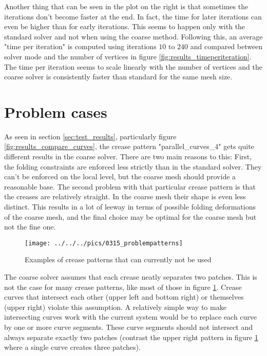 \documentclass[a4paper,twoside,12pt,nochapterprefix]{scrbook}
\begin{document}
Another thing that can be seen in the plot on the right is that sometimes the iterations don't become faster at the end. In fact, the time for later iterations can even be higher than for early iterations. This seems to happen only with the standard solver and not when using the coarse method.\newline
Following this, an average "time per iteration" is computed using iterations $10$ to $240$ and compared between solver mode and the number of vertices in figure \ref{fig:results_timeperiteration}. The time per iteration seems to scale linearly with the number of vertices and the coarse solver is consistently faster than standard for the same mesh size.\newline %

\section{Problem cases}\label{sec:problem_cases}
As seen in section \ref{sec:test_results}, particularly figure \ref{fig:results_compare_curves}, the crease pattern "parallel\_curves\_4" gets quite different results in the coarse solver. There are two main reasons to this: First, the folding constraints are enforced less strictly than in the standard solver. They can't be enforced on the local level, but the coarse mesh should provide a reasonable base. The second problem with that particular crease pattern is that the creases are relatively straight. In the coarse mesh their shape is even less distinct. This results in a lot of leeway in terms of possible folding deformations of the coarse mesh, and the final choice may be optimal for the coarse mesh but not the fine one.\newline
\begin{figure}
    \centering
    \texttt{[image: ../../../pics/0315\_problempatterns]}
    \caption{Examples of crease patterns that can currently not be used}
      \label{fig:problempatterns}
\end{figure}
The coarse solver assumes that each crease neatly separates two patches. This is not the case for many crease patterns, like most of those in figure \ref{fig:problempatterns}. Crease curves that intersect each other (upper left and bottom right) or themselves (upper right) violate this assumption. A relatively simple way to make intersecting curves work with the current system would be to replace each curve by one or more curve segments. These curve segments should not intersect and always separate exactly two patches (contrast the upper right pattern in figure \ref{fig:problempatterns} where a single curve creates three patches).\newline
\end{document}
